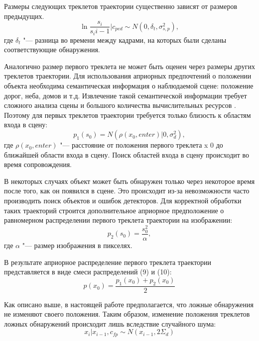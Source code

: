 Размеры следующих треклетов траектории существенно зависят от размеров предыдущих.
\begin{equation}
	\ln{\frac{s_i}{s_i{i-1}}}\bigg\rvert c_{ped} \sim N(0, \delta_t, \sigma_{s, p}^2),
\end{equation}
где $\delta_t$ "--- разница во времени между кадрами, на которых были сделаны соответствующие обнаружения.

Аналогично размер первого треклета не может быть оценен через размеры других треклетов траектории. Для использования априорных предпочтений о положении объекта необходима семантическая информация о наблюдаемой сцене: положение дорог, неба, домов и т.д. Извлечение такой семантической информации требует сложного анализа сцены и большого количества вычислительных ресурсов \cite{fulkerson2009class}. Поэтому для первых треклетов траектории требуется только близость к областям входа в сцену:
\begin{equation}
 	p_1(s_0) = N(\rho(x_0, enter)|0, \sigma_d^2),
\end{equation}
где $\rho(x_0, enter)$ "--- расстояние от положения первого треклета x 0 до ближайшей области входа в сцену. Поиск областей входа в сцену происходит во время сопровождения.

В некоторых случаях объект может быть обнаружен только через некоторое время после того, как он появился в сцене. Это происходит из-за невозможности часто производить поиск объектов и ошибок детекторов. Для корректной обработки таких траекторий строится дополнительное априорное предположение о равномерном распределении первого треклета траектории
на изображении:
\begin{equation}
	p_2(s_0)= \frac{s_0^2}{\alpha},
\end{equation}
где $\alpha$ "--- размер изображения в пикселях.

В результате априорное распределение первого треклета траектории представляется в виде смеси распределений (9) и (10):
\begin{equation}
	p(x_0) = \frac{p_1(x_0) + p_2(x_0)}{2}
\end{equation}

Как описано выше, в настоящей работе предполагается, что ложные обнаружения не изменяют своего положения. Таким образом, изменение положения треклетов ложных обнаружений происходит лишь вследствие случайного шума:
\begin{equation}
	x_i\bigg\rvert x_{i-1}, c_{fp} \sim N(x_{i-1}, 2\Sigma_d)
\end{equation}

